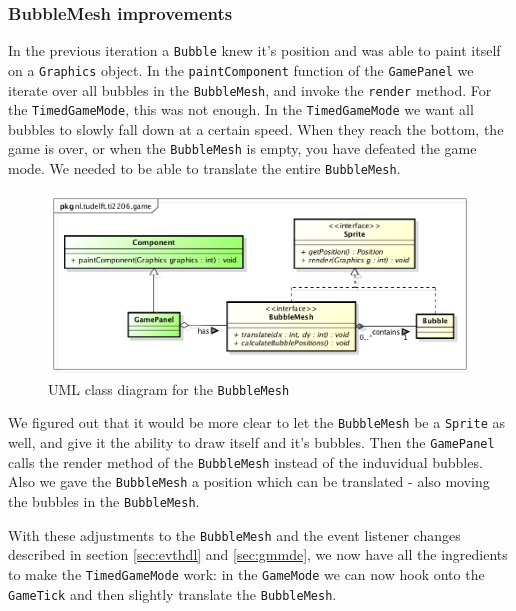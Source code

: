 \documentclass[a4paper]{article}
\begin{document}
\subsubsection{BubbleMesh improvements}
In the previous iteration a \texttt{Bubble} knew it's position and was able to paint itself on a \texttt{Graphics} object. In the \texttt{paintComponent} function of the \texttt{GamePanel} we iterate over all bubbles in the \texttt{BubbleMesh}, and invoke the \texttt{render} method.
For the \texttt{TimedGameMode}, this was not enough. In the \texttt{TimedGameMode} we want all bubbles to slowly fall down at a certain speed. When they reach the bottom, the game is over, or when the \texttt{BubbleMesh} is empty, you have defeated the game mode. We needed to be able to translate the entire \texttt{BubbleMesh}.

\begin{figure}[H]
	\centering
	\includegraphics[scale=0.5]{BubbleMeshSprite.png}
    \caption{UML class diagram for the \texttt{BubbleMesh} }
    \label{fig:bmeshsprite}
\end{figure}

We figured out that it would be more clear to let the \texttt{BubbleMesh} be a \texttt{Sprite} as well, and give it the ability to draw itself and it's bubbles. Then the \texttt{GamePanel} calls the render method of the \texttt{BubbleMesh} instead of the induvidual bubbles. Also we gave the \texttt{BubbleMesh} a position which can be translated - also moving the bubbles in the \texttt{BubbleMesh}.

\par{} With these adjustments to the \texttt{BubbleMesh} and the event listener changes described in section \ref{sec:evthdl} and \ref{sec:gmmde}, we now have all the ingredients to make the \texttt{TimedGameMode} work: in the \texttt{GameMode} we can now hook onto the \texttt{GameTick} and then slightly translate the \texttt{BubbleMesh}.
\end{document}
